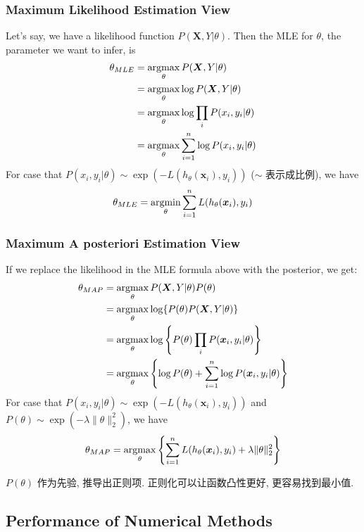 \subsubsection{Maximum Likelihood Estimation View}
Let's say, we have a likelihood function $P(\bm X, Y|\theta)$. Then the MLE for $\theta$, the parameter we want to infer, is 
\begin{align*}
    \theta_{MLE}&=\operatorname*{argmax}_\theta P(\bm X, Y|\theta)\\
    &=\operatorname*{argmax}_\theta \log P(\bm X, Y|\theta)\\
    &=\operatorname*{argmax}_\theta \log \prod_i P(x_i, y_i|\theta)\\
    &=\operatorname*{argmax}_\theta \sum_{i=1}^n \log P(x_i, y_i|\theta)
\end{align*}
For case that $P(x_i, y_i|\theta)\sim \exp(-L(h_\theta(\bm x_i), y_i))$ ($\sim$ 表示成比例), we have
\begin{align*}
    \theta_{MLE}=\operatorname*{argmin}_\theta \sum_{i=1}^n L(h_\theta(\bm x_i), y_i)
\end{align*}

\subsubsection{Maximum A posteriori Estimation View}
If we replace the likelihood in the MLE formula above with the posterior, we get:
\begin{align*}
    \theta_{MAP}&=\operatorname*{argmax}_\theta P(\bm X, Y|\theta)P(\theta)\\
    &=\operatorname*{argmax}_\theta\log\{ P(\theta)P(\bm X, Y|\theta) \}\\
    &=\operatorname*{argmax}_\theta\log \left\{ P(\theta)\prod_i P(\bm x_i, y_i|\theta) \right\}\\
    &=\operatorname*{argmax}_\theta\left\{ \log P(\theta)+\sum_{i=1}^n \log P(\bm x_i, y_i|\theta)\right\}
\end{align*}
For case that $P(x_i, y_i|\theta)\sim \exp(-L(h_\theta(\bm x_i), y_i))$ and $P(\theta)\sim \exp(-\lambda\|\theta\|_2^2)$, we have
\begin{align*}
    \theta_{MAP}=\operatorname*{argmax}_\theta\left\{ \sum_{i=1}^n L(h_\theta(\bm x_i), y_i)+\lambda \|\theta\|_2^2 \right\}
\end{align*}

$P(\theta)$ 作为先验, 推导出正则项. 正则化可以让函数凸性更好, 更容易找到最小值. 

\subsection{Performance of Numerical Methods}
